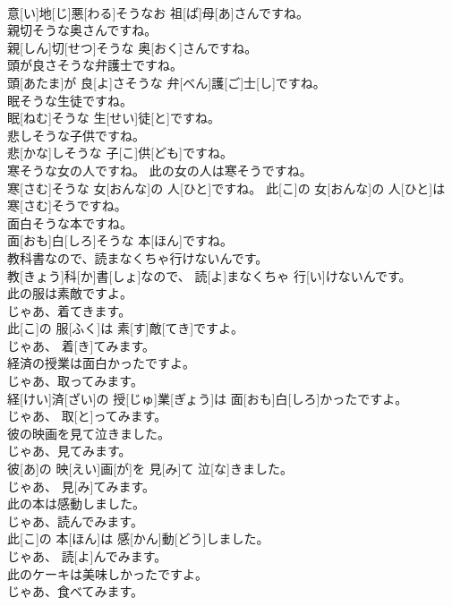 \documentclass[8pt]{extreport}
\begin{document}
\begin{CJK}{UTF8}{min}
\\	意[い]地[じ]悪[わる]そうなお 祖[ば]母[あ]さんですね。
\\	親切そうな奥さんですね。	
\\	親[しん]切[せつ]そうな 奥[おく]さんですね。
\\	頭が良さそうな弁護士ですね。	
\\	頭[あたま]が 良[よ]さそうな 弁[べん]護[ご]士[し]ですね。
\\	眠そうな生徒ですね。	
\\	眠[ねむ]そうな 生[せい]徒[と]ですね。
\\	悲しそうな子供ですね。	
\\	悲[かな]しそうな 子[こ]供[ども]ですね。
\\	寒そうな女の人ですね。 此の女の人は寒そうですね。	
\\	寒[さむ]そうな 女[おんな]の 人[ひと]ですね。 此[こ]の 女[おんな]の 人[ひと]は 寒[さむ]そうですね。
\\	面白そうな本ですね。	
\\	面[おも]白[しろ]そうな 本[ほん]ですね。
\\	教科書なので、読まなくちゃ行けないんです。	
\\	教[きょう]科[か]書[しょ]なので、 読[よ]まなくちゃ 行[い]けないんです。
\\	此の服は素敵ですよ。 
\\	じゃあ、着てきます。	
\\	此[こ]の 服[ふく]は 素[す]敵[てき]ですよ。 
\\	じゃあ、 着[き]てみます。
\\	経済の授業は面白かったですよ。 
\\	じゃあ、取ってみます。	
\\	経[けい]済[ざい]の 授[じゅ]業[ぎょう]は 面[おも]白[しろ]かったですよ。 
\\	じゃあ、 取[と]ってみます。
\\	彼の映画を見て泣きました。 
\\	じゃあ、見てみます。	
\\	彼[あ]の 映[えい]画[が]を 見[み]て 泣[な]きました。 
\\	じゃあ、 見[み]てみます。
\\	此の本は感動しました。 
\\	じゃあ、読んでみます。	
\\	此[こ]の 本[ほん]は 感[かん]動[どう]しました。 
\\	じゃあ、 読[よ]んでみます。
\\	此のケーキは美味しかったですよ。 
\\	じゃあ、食べてみます。	

\end{CJK}
\end{document}
